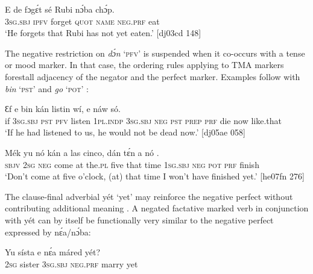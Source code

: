 \ea%
    \label{ex:key:395}
    \gll E    de  fɔgɛ́t  sé    Rubi    nɔ́ba  chɔ́p.\\
\textsc{3sg.sbj}  \textsc{ipfv}  forget  \textsc{quot}    \textsc{name}  \textsc{neg}.\textsc{prf}  eat\\

\glt ‘He forgets that Rubi has not yet eaten.’ [dj03cd 148]
\z

The negative restriction on \textit{dɔ́n} ‘\textsc{pfv}’ is suspended when it co-occurs with a tense or mood marker. In that case, the ordering rules applying to TMA markers forestall adjacency of the negator and the perfect marker. Examples follow with \textit{bin} ‘\textsc{pst}’  and \textit{go} ‘\textsc{pot}’ :


\ea%
    \label{ex:key:396}
    \gll Ɛf  e    bin  kán  listin  wí,    e      
    náw    só.\\
if  \textsc{3sg.sbj}  \textsc{pst}  \textsc{pfv}  listen  \textsc{1pl.indp}  \textsc{3sg.sbj}  \textsc{neg}  \textsc{pst}
\textsc{prep}  \textsc{prf}  die  now    like.that\\

\glt ‘If he had listened to us, he would not be dead now.’ [dj05ae 058]
\z


\ea%
    \label{ex:key:397}
    \gll Mék    yu  nó  kán    a  las     cinco,  dán  tɛ́n  a    nó
    .\\
\textsc{sbjv}    \textsc{2sg}  \textsc{neg}  come  at  the.\textsc{pl}  five    that  time  \textsc{1sg.sbj}  \textsc{neg}
\textsc{pot}  \textsc{prf}  finish\\

\glt ‘Don’t come at five o’clock, (at) that time I won’t have finished yet.’ [he07fn 276]
\z

The clause-final adverbial yét ‘yet’ may reinforce the negative perfect without contributing additional meaning . A negated factative{\fff} marked verb in conjunction with yét  can by itself be functionally very similar to the negative perfect expressed by nɛ́a/nɔ́ba:


\ea%
    \label{ex:key:398}
    \gll Yu  sísta    e    nɛ́a    máred  yét?\\
\textsc{2sg}  sister  \textsc{3sg.sbj}  \textsc{neg}.\textsc{prf}  marry  yet\\

